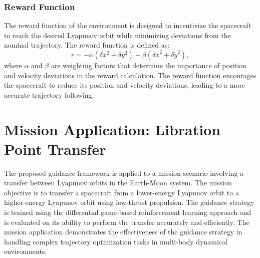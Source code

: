 \documentclass[conference]{IEEEtran}
\begin{document}
\subsubsection{Reward Function}
The reward function of the environment is designed to incentivize the spacecraft to reach the desired Lyapunov orbit while minimizing deviations from the nominal trajectory. The reward function is defined as:
\begin{equation}
	r = -\alpha \left( \delta x^2 + \delta y^2 \right) - \beta \left( \delta \dot{x}^2 + \delta \dot{y}^2 \right),
\end{equation}
where \( \alpha \) and \( \beta \) are weighting factors that determine the importance of position and velocity deviations in the reward calculation. The reward function encourages the spacecraft to reduce its position and velocity deviations, leading to a more accurate trajectory following.
\section{Mission Application: Libration Point Transfer}
The proposed guidance framework is applied to a mission scenario involving a transfer between Lyapunov orbits in the Earth-Moon system. The mission objective is to transfer a spacecraft from a lower-energy Lyapunov orbit to a higher-energy Lyapunov orbit using low-thrust propulsion. The guidance strategy is trained using the differential game-based reinforcement learning approach and is evaluated on its ability to perform the transfer accurately and efficiently. The mission application demonstrates the effectiveness of the guidance strategy in handling complex trajectory optimization tasks in multi-body dynamical environments.
\end{document}
